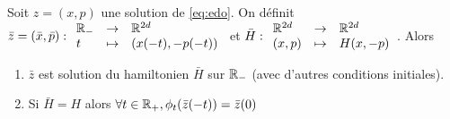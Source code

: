 \documentclass[10pt,a4paper]{article}
\begin{document}
\begin{Lem}\label{lem:sol-inverse}
  Soit $z = (x,p)$ une solution de \eqref{eq:edo}. On définit $\bar{z} = (\bar x, \bar p) : { \begin{array}{lcl} \mathbb{R}_{-} & \to & \mathbb{R}^{2d} \\ t & \mapsto & (x(-t), -p(-t)) \end{array} }$ et $\bar H : { \begin{array}{lcl} \mathbb{R}^{2d} & \to & \mathbb{R}^{2d} \\ (x,p) & \mapsto & H(x,-p) \end{array} }$. Alors

  \begin{enumerate}
  \item $\bar{z}$ est solution du hamiltonien $\bar H$ sur $\mathbb{R}_{-}$ (avec d'autres conditions initiales).
  \item Si $\bar{H} = H$ alors $\forall t \in \mathbb{R}_+, \phi_t(\bar{z}(-t)) = \bar{z}(0)$
  \end{enumerate}
  
\end{Lem}
\end{document}
